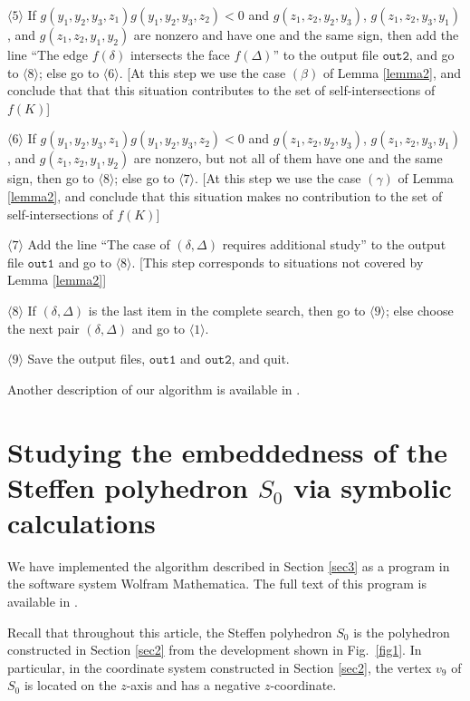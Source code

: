 \documentclass[12pt, reqno]{amsart}
\begin{document}
$\langle 5\rangle$
If
$g(y_1, y_2, y_3, z_1)g(y_1, y_2, y_3, z_2)<0$ 
and
$g(z_1, z_2, y_2, y_3)$, $g(z_1, z_2, y_3, y_1)$,
and
$g(z_1, z_2, y_1, y_2)$
are nonzero and have one and the same sign, then 
add the line ``The edge 
$f(\delta)$ 
intersects the face
$f(\Delta)$''
to the output file 
$\texttt{out2}$,
and go to 
$\langle 8\rangle$;
else go to 
$\langle 6\rangle$.
[At this step we use the case 
$(\beta)$ 
of Lemma \ref{lemma2}, and conclude that that this situation contributes 
to the set of self-intersections of
$f(K)$]

$\langle 6\rangle$ 
If
$g(y_1, y_2, y_3, z_1)g(y_1, y_2, y_3, z_2)<0$ 
and
$g(z_1, z_2, y_2, y_3)$, $g(z_1, z_2, y_3, y_1)$,
and
$g(z_1, z_2, y_1, y_2)$
are nonzero, but not all of them have one and the same sign, then go to 
$\langle 8\rangle$; 
else go to 
$\langle 7\rangle$.
[At this step we use the case 
$(\gamma)$ 
of Lemma \ref{lemma2},
and conclude that this situation makes no contribution to the set of 
self-intersections of
$f(K)$]

$\langle 7\rangle$
Add the line ``The case of 
$(\delta, \Delta)$ 
requires additional study'' to the output file 
$\texttt{out1}$
and go to 
$\langle 8\rangle$.
[This step corresponds to situations not covered by Lemma \ref{lemma2}]

$\langle 8\rangle$ 
If 
$(\delta, \Delta)$ 
is the last item in the complete search, then go to 
$\langle 9\rangle$; 
else choose the next pair 
$(\delta, \Delta)$ 
and go to 
$\langle 1\rangle$.

$\langle 9\rangle$ 
Save the output files, 
$\texttt{out1}$ 
and 
$\texttt{out2}$, 
and quit.

Another description of our algorithm is available in \cite{AV24}.

\section{Studying the embeddedness of the Steffen polyhedron $S_0$ via symbolic calculations}\label{sec4} 

We have implemented the algorithm described in Section \ref{sec3} as 
a program in the software system Wolfram Mathematica.
The full text of this program is available in \cite{AV25}.

Recall that throughout this article, the Steffen polyhedron
$S_0$ 
is the polyhedron constructed in Section \ref{sec2} from the development
shown in Fig.~\ref{fig1}.
In particular, in the coordinate system constructed in Section \ref{sec2}, the vertex 
$v_9$
of
$S_0$
is located on the $z$-axis and has a negative $z$-coordinate.
\end{document}
